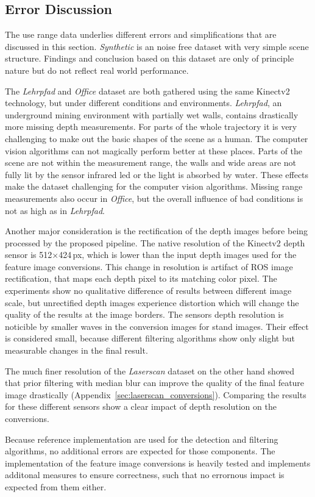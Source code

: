 \subsection{Error Discussion}

The use range data underlies different errors and simplifications that are discussed in this section.
\emph{Synthetic} is an noise free dataset with very simple scene structure.
Findings and conclusion based on this dataset are only of principle nature but do not reflect real world performance.

The \emph{Lehrpfad} and \emph{Office} dataset are both gathered using the same Kinectv2 technology, but under different conditions and environments.
\emph{Lehrpfad}, an underground mining environment with partially wet walls, contains drastically more missing depth measurements.
For parts of the whole trajectory it is very challenging to make out the basic shapes of the scene as a human.
The computer vision algorithms can not magically perform better at these places.
Parts of the scene are not within the measurement range, the walls and wide areas are not fully lit by the sensor infrared \acrshort{led} or the light is absorbed by water.
These effects make the dataset challenging for the computer vision algorithms.
Missing range measurements also occur in \emph{Office}, but the overall influence of bad conditions is not as high as in \emph{Lehrpfad}.

Another major consideration is the rectification of the depth images before being processed by the proposed pipeline.
The native resolution of the Kinectv2 depth sensor is 512$\times$424\,px\cite{wasenmuller_accv2016}, which is lower than the input depth images used for the feature image conversions.
This change in resolution is artifact of \acrshort{ROS} image rectification, that maps each depth pixel to its matching color pixel.
The experiments show no qualitative difference of results between different image scale, but unrectified depth images experience distortion which will change the quality of the results at the image borders.
The sensors depth resolution is noticible by smaller waves in the conversion images for stand images.
Their effect is considered small, because different filtering algorithms show only slight but measurable changes in the final result.

The much finer resolution of the \emph{Laserscan} dataset on the other hand showed that prior filtering with median blur can improve the quality of the final feature image drastically (Appendix~\ref{sec:laserscan_conversions}).
Comparing the results for these different sensors show a clear impact of depth resolution on the conversions.

Because reference implementation are used for the detection and filtering algorithms, no additional errors are expected for those components.
The implementation of the feature image conversions is heavily tested and implements additonal measures to ensure correctness, such that no errornous impact is expected from them either.
